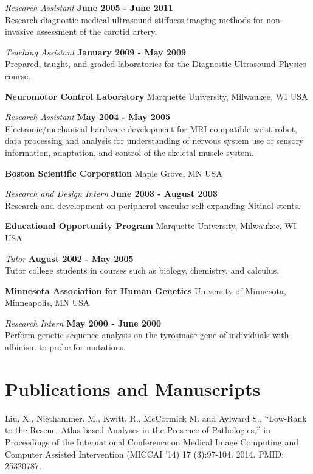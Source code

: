 \documentclass[margin,line]{res}
\begin{document}
\begin{resume}
\vspace{-.3cm}
{\em Research Assistant} \hfill {\bf June 2005 - June 2011} \\
Research diagnostic medical ultrasound stiffness imaging methods for non-invasive assessment of the carotid artery.

\vspace{-.3cm}
{\em Teaching Assistant} \hfill {\bf January 2009 - May 2009} \\
Prepared, taught, and graded laboratories for the Diagnostic Ultrasound Physics
course.

{\bf Neuromotor Control Laboratory} Marquette University, Milwaukee, WI USA

\vspace{-.3cm}
{\em Research Assistant} \hfill {\bf May 2004 - May 2005} \\
Electronic/mechanical hardware development for MRI compatible wrist robot, data processing and analysis for understanding of nervous system use of sensory information,  adaptation,  and control of the skeletal muscle system.

{\bf Boston Scientific Corporation} Maple Grove, MN USA

\vspace{-.3cm}
{\em Research and Design Intern} \hfill {\bf June 2003 - August 2003} \\
Research and development on peripheral vascular self-expanding Nitinol stents.

{\bf Educational Opportunity Program} Marquette University, Milwaukee, WI USA

\vspace{-.3cm}
{\em Tutor} \hfill {\bf August 2002 - May 2005} \\
Tutor college students in courses such as biology, chemistry, and calculus.

{\bf Minnesota Association for Human Genetics} University of Minnesota, Minneapolis, MN USA

\vspace{-.3cm}
{\em Research Intern} \hfill {\bf May 2000 - June 2000} \\
Perform genetic sequence analysis on the tyrosinase gene of individuals with albinism to probe for mutations.

\section{\sc Publications and Manuscripts}

Liu, X., Niethammer, M., Kwitt, R., McCormick M. and Aylward S., “Low-Rank to the
Rescue: Atlas-based Analyses in the Presence of Pathologies,” in Proceedings of
the International Conference on Medical Image Computing and Computer Assisted
Intervention (MICCAI '14) 17 (3):97-104. 2014. PMID: 25320787.


\end{resume}
\end{document}
